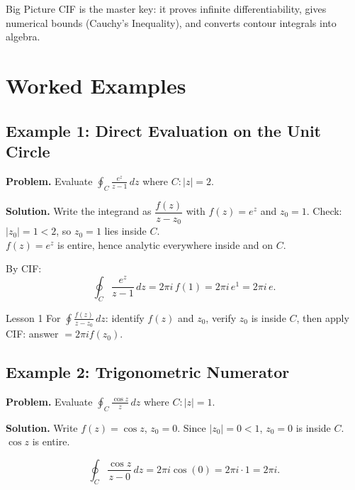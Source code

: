 \documentclass[12pt,a4paper]{article}
\begin{document}
\begin{learnbox}{Big Picture}
CIF is the master key: it proves infinite differentiability, gives numerical bounds
(Cauchy's Inequality), and converts contour integrals into algebra.
\end{learnbox}

\section{Worked Examples}

\subsection*{Example 1: Direct Evaluation on the Unit Circle}

\textbf{Problem.} Evaluate $\displaystyle\oint_{C} \frac{e^z}{z - 1}\,dz$
where $C: |z| = 2$.

\textbf{Solution.}
Write the integrand as $\dfrac{f(z)}{z - z_0}$ with $f(z) = e^z$ and $z_0 = 1$.
Check: $|z_0| = 1 < 2$, so $z_0 = 1$ lies inside $C$. \\
$f(z) = e^z$ is entire, hence analytic everywhere inside and on $C$.

By CIF:
\[
  \oint_{C} \frac{e^z}{z - 1}\,dz = 2\pi i\, f(1) = 2\pi i\, e^1 = 2\pi i\, e.
\]

\begin{learnbox}{Lesson 1}
For $\oint \frac{f(z)}{z-z_0}\,dz$: identify $f(z)$ and $z_0$, verify $z_0$ is inside
$C$, then apply CIF: answer $= 2\pi i f(z_0)$.
\end{learnbox}

\subsection*{Example 2: Trigonometric Numerator}

\textbf{Problem.} Evaluate $\displaystyle\oint_{C} \frac{\cos z}{z}\,dz$
where $C: |z| = 1$.

\textbf{Solution.}
Write $f(z) = \cos z$, $z_0 = 0$. Since $|z_0| = 0 < 1$, $z_0 = 0$ is inside $C$.
$\cos z$ is entire.

\[
  \oint_{C} \frac{\cos z}{z - 0}\,dz = 2\pi i \cos(0) = 2\pi i \cdot 1 = 2\pi i.
\]
\end{document}
